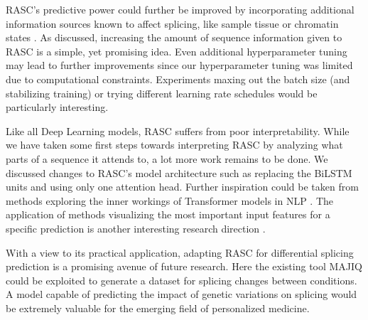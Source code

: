 RASC's predictive power could further be improved by incorporating additional information sources known to affect splicing, like sample tissue or chromatin states \cite{chromatin}. As discussed, increasing the amount of sequence information given to RASC is a simple, yet promising idea. 
Even additional hyperparameter tuning may lead to further improvements since our hyperparameter tuning was limited due to computational constraints. Experiments maxing out the batch size (and stabilizing training) or trying different learning rate schedules would be particularly interesting. 


Like all Deep Learning models, RASC suffers from poor interpretability. While we have taken some first steps towards interpreting RASC by analyzing what parts of a sequence it attends to, a lot more work remains to be done. We discussed changes to RASC's model architecture such as replacing the BiLSTM units and using only one attention head. Further inspiration could be taken from methods exploring the inner workings of Transformer models in NLP \cite{interpretingbert}. The application of methods visualizing the most important input features for a specific prediction is another interesting research direction \cite{deeplift}. 
%

With a view to its practical application, adapting RASC for differential splicing prediction is a promising avenue of future research. Here the existing tool MAJIQ could be exploited to generate a dataset for splicing changes between conditions. A model capable of predicting the impact of genetic variations on splicing would be extremely valuable for the emerging field of personalized medicine.




%
%
% 
%
%

